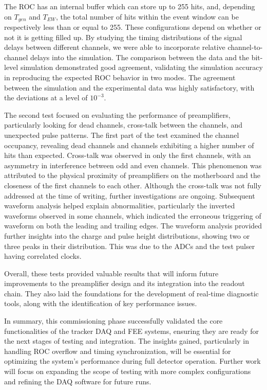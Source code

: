 The ROC has an internal buffer which can store up to 255 hits, 
and, depending on \( T_{gen} \) and \( T_{EW} \), 
the total number of hits within the event window 
can be respectively less than or equal to 255. 
These configurations depend on whether or not it is getting filled up.
By studying the timing distributions of the signal delays 
between different channels, we 
were able to incorporate relative channel-to-channel delays into 
the simulation. The comparison 
between the data and the bit-level simulation 
demonstrated good agreement, 
validating the simulation accuracy in reproducing 
the expected ROC behavior in   
two modes. The agreement between 
the simulation and the experimental data was highly satisfactory,
with the deviations at a level of \( 10^{-3} \).

The second test focused on evaluating the 
performance of preamplifiers, 
particularly looking for dead channels, 
cross-talk between the channels, 
and unexpected pulse patterns. The first part 
of the test examined the channel occupancy, revealing 
dead channels and channels exhibiting a higher 
number of hits than expected. 
Cross-talk was observed in only the first channels, 
with an asymmetry in interference 
between odd and even channels. This phenomenon was 
attributed to the physical proximity 
of preamplifiers on the motherboard and the 
closeness of the first channels to each other. 
Although the cross-talk was not fully addressed at 
the time of writing, further investigations 
are ongoing. Subsequent waveform analysis helped explain 
abnormalities, particularly the inverted 
waveforms observed in some channels, which indicated 
the erroneous triggering of waveform 
on both the leading and trailing edges. The 
waveform analysis 
provided further insights into the charge and 
pulse height distributions, showing two or 
three peaks in their distribution. This was due 
to the ADCs and the test pulser having 
correlated clocks. 

Overall, these tests provided valuable results 
that will inform future improvements to the 
preamplifier design and its integration into 
the readout chain. They also laid the foundations 
for the development of real-time 
diagnostic tools, along with the identification of 
key performance issues.

In summary, this commissioning phase successfully validated 
the core functionalities 
of the tracker DAQ and FEE systems, ensuring they are ready 
for the next stages of 
testing and integration. The insights gained, particularly 
in handling ROC overflow 
and timing synchronization, will be essential for optimizing 
the system's performance 
during full detector operation. Further work will focus on 
expanding the scope of 
testing with more complex configurations and refining the 
DAQ software for future runs.


